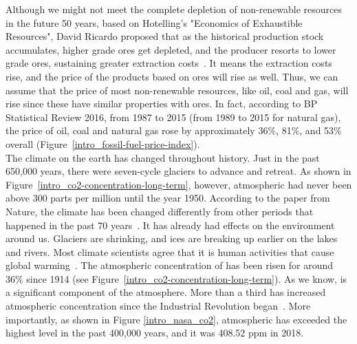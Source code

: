 Although we might not meet the complete depletion of non-renewable resources in the future 50 years, based on Hotelling’s "Economics of Exhaustible Resources", David Ricardo proposed that as the historical production stock accumulates, higher grade ores get depleted, and the producer resorts to lower grade ores, sustaining greater extraction costs~\cite{devarajan1981hotelling}. It means the extraction costs rise, and the price of the products based on ores will rise as well. Thus, we can assume that the price of most non-renewable resources, like oil, coal and gas, will rise since these have similar properties with ores. In fact, according to BP Statistical Review 2016, from 1987 to 2015 (from 1989 to 2015 for natural gas), the price of oil, coal and natural gas rose by approximately 36\%, 81\%, and 53\% overall (Figure~\ref{intro_fossil-fuel-price-index}). \\

The climate on the earth has changed throughout history. Just in the past 650,000 years, there were seven-cycle glaciers to advance and retreat. As shown in Figure~\ref{intro_co2-concentration-long-term}, however, atmospheric  had never been above 300 parts per million until the year 1950. According to the paper from Nature, the climate has been changed differently from other periods that happened in the past 70 years~\cite{parmesan2003globally}. It has already had effects on the environment around us. Glaciers are shrinking, and ices are breaking up earlier on the lakes and rivers. Most climate scientists agree that it is human activities that cause global warming~\cite{epic337530}. The atmospheric concentration of  has been risen for around 36\% since 1914 (see Figure~\ref{intro_co2-concentration-long-term}). As we know,  is a significant component of the atmosphere. More than a third has increased atmospheric  concentration since the Industrial Revolution began~\cite{epic337530}. More importantly, as shown in Figure \ref{intro_nasa_co2}, atmospheric  has exceeded the highest level in the past 400,000 years, and it was 408.52 ppm in 2018. \\

